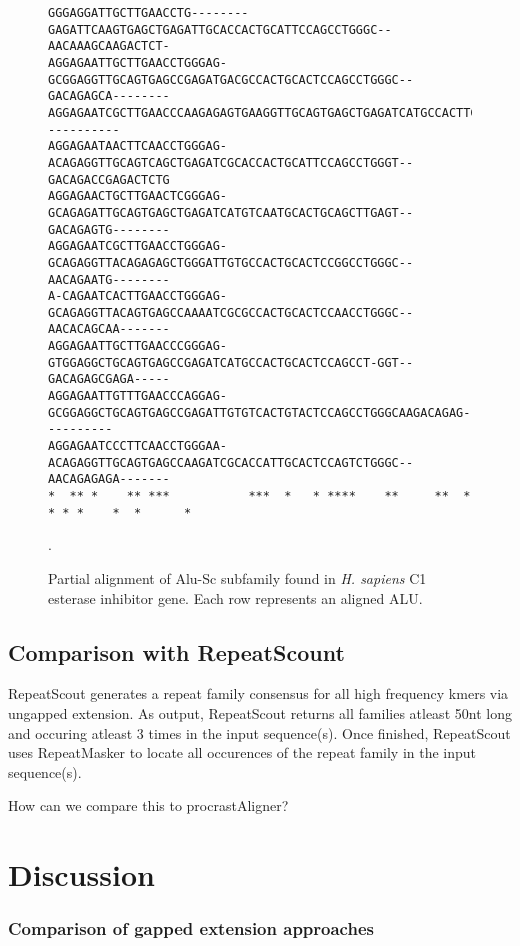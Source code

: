 \documentclass{llncs}
\begin{document}
\begin{figure}[t]
\scriptsize
\begin{verbatim}
GGGAGGATTGCTTGAACCTG--------GAGATTCAAGTGAGCTGAGATTGCACCACTGCATTCCAGCCTGGGC--AACAAAGCAAGACTCT-
AGGAGAATTGCTTGAACCTGGGAG-GCGGAGGTTGCAGTGAGCCGAGATGACGCCACTGCACTCCAGCCTGGGC--GACAGAGCA--------
AGGAGAATCGCTTGAACCCAAGAGAGTGAAGGTTGCAGTGAGCTGAGATCATGCCACTTCACTCCAGCCTGAGTGAAACAGC-----------
AGGAGAATAACTTCAACCTGGGAG-ACAGAGGTTGCAGTCAGCTGAGATCGCACCACTGCATTCCAGCCTGGGT--GACAGACCGAGACTCTG
AGGAGAACTGCTTGAACTCGGGAG-GCAGAGATTGCAGTGAGCTGAGATCATGTCAATGCACTGCAGCTTGAGT--GACAGAGTG--------
AGGAGAATCGCTTGAACCTGGGAG-GCAGAGGTTACAGAGAGCTGGGATTGTGCCACTGCACTCCGGCCTGGGC--AACAGAATG--------
A-CAGAATCACTTGAACCTGGGAG-GCAGAGGTTACAGTGAGCCAAAATCGCGCCACTGCACTCCAACCTGGGC--AACACAGCAA-------
AGGAGAATTGCTTGAACCCGGGAG-GTGGAGGCTGCAGTGAGCCGAGATCATGCCACTGCACTCCAGCCT-GGT--GACAGAGCGAGA-----
AGGAGAATTGTTTGAACCCAGGAG-GCGGAGGCTGCAGTGAGCCGAGATTGTGTCACTGTACTCCAGCCTGGGCAAGACAGAG----------
AGGAGAATCCCTTCAACCTGGGAA-ACAGAGGTTGCAGTGAGCCAAGATCGCACCATTGCACTCCAGTCTGGGC--AACAGAGAGA-------
*  ** *    ** ***           ***  *   * ****    **     **  * * * *    *  *      *

\end{verbatim}
\vspace{-0.5cm}
\normalsize
\caption{Partial alignment of Alu-Sc subfamily found in \emph{H. sapiens} C1 esterase inhibitor gene. Each row represents an aligned ALU.}.
\end{figure}

\subsection{Comparison with RepeatScount}

RepeatScout generates a repeat family consensus for all high frequency kmers via ungapped extension. As output, RepeatScout returns all families atleast 50nt long and occuring atleast 3 times in the input sequence(s). Once finished, RepeatScout uses RepeatMasker to locate all occurences of the repeat family in the input sequence(s).

How can we compare this to procrastAligner?


\section{Discussion}
\subsubsection{Comparison of gapped
extension approaches}
\end{document}
